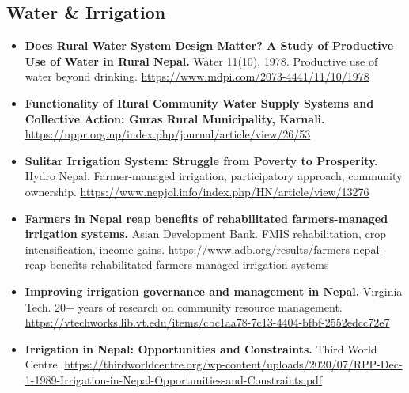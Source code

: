 \documentclass[11pt,a4paper]{article}
\begin{document}
\subsection{Water \& Irrigation}
\begin{itemize}
    \item \textbf{Does Rural Water System Design Matter? A Study of Productive Use of Water in Rural Nepal.} Water 11(10), 1978. 
    Productive use of water beyond drinking. \url{https://www.mdpi.com/2073-4441/11/10/1978}
    \item \textbf{Functionality of Rural Community Water Supply Systems and Collective Action: Guras Rural Municipality, Karnali.} \url{https://nppr.org.np/index.php/journal/article/view/26/53}
    \item \textbf{Sulitar Irrigation System: Struggle from Poverty to Prosperity.} Hydro Nepal. Farmer-managed irrigation, participatory approach, 
    community ownership. \url{https://www.nepjol.info/index.php/HN/article/view/13276}
    \item \textbf{Farmers in Nepal reap benefits of rehabilitated farmers-managed irrigation systems.} 
    Asian Development Bank. FMIS rehabilitation, crop intensification, income gains. \url{https://www.adb.org/results/farmers-nepal-reap-benefits-rehabilitated-farmers-managed-irrigation-systems}
    \item \textbf{Improving irrigation governance and management in Nepal.} Virginia Tech. 20+ years of research on community resource management. \url{https://vtechworks.lib.vt.edu/items/cbc1aa78-7c13-4404-bfbf-2552edcc72e7}
    \item \textbf{Irrigation in Nepal: Opportunities and Constraints.} Third World Centre. \url{https://thirdworldcentre.org/wp-content/uploads/2020/07/RPP-Dec-1-1989-Irrigation-in-Nepal-Opportunities-and-Constraints.pdf}
\end{itemize}
\end{document}
